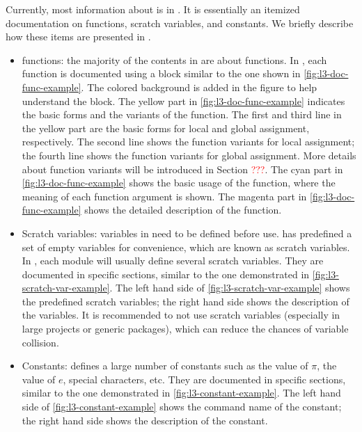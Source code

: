 \documentclass{ltugboat}
\begin{document}
Currently, most information about \LTT{} is in \cite{l3interface}. 
It is essentially an itemized documentation on \LTT{} functions, scratch variables, and constants. 
We briefly describe how these items are presented in \cite{l3interface}.
\begin{itemize}
\item \LTT{} functions: the majority of the contents in \cite{l3interface} are about \LTT{} functions.
In \cite{l3interface}, each function is documented using a block similar to the one shown in  \cref{fig:l3-doc-func-example}.
The colored background is added in the figure to help understand the block.
The yellow part in \cref{fig:l3-doc-func-example} indicates the basic forms and the variants of the function. 
The first and third line in the yellow part are the basic forms for local and global assignment, respectively.
The second line shows the function variants for local assignment; the fourth line shows the function variants for global assignment.
More details about function variants will be introduced in Section \textcolor{red}{???}.
The cyan part in \cref{fig:l3-doc-func-example} shows the basic usage of the function, where the meaning of each function argument is shown.
The magenta part in \cref{fig:l3-doc-func-example} shows the detailed description of the function.

\item Scratch variables: variables in \LTT{} need to be defined before use. 
\LTT{} has predefined a set of empty variables for convenience, which are known as scratch variables.
In \LTT{}, each module will usually define several scratch variables.
They are documented in specific sections, similar to the one demonstrated in \cref{fig:l3-scratch-var-example}.
The left hand side of \cref{fig:l3-scratch-var-example} shows the predefined scratch variables; the right hand side shows the description of the variables.
It is recommended to not use scratch variables (especially in large projects or generic packages), which can reduce the chances of variable collision.

\item Constants: \LTT{} defines a large number of constants such as the value of $\pi$, the value of $e$, special characters, etc. 
They are documented in specific sections, similar to the one demonstrated in \cref{fig:l3-constant-example}.
The left hand side of \cref{fig:l3-constant-example} shows the command name of the constant; the right hand side shows the description of the constant.

\end{itemize}
\end{document}
